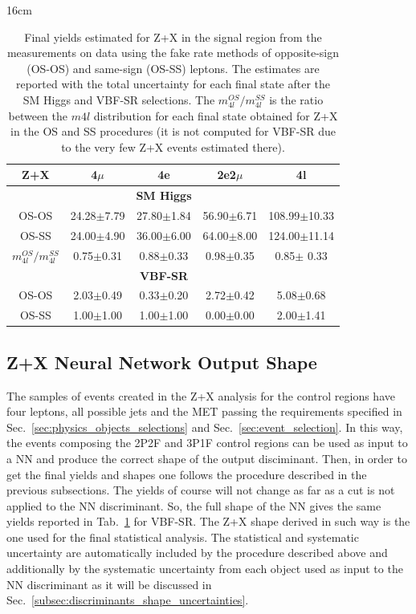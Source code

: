 \begin{table}[hbtp]{16cm}
	\centering
	\caption{Final yields estimated for Z+X in the signal region from the measurements on data using the fake rate methods of opposite-sign (OS-OS) and same-sign (OS-SS) leptons. The estimates are reported with the total uncertainty for each final state after the SM Higgs and VBF-SR selections. The $m_{4l}^{OS}/m_{4l}^{SS}$ is the ratio between the $m4l$ distribution for each final state obtained for Z+X in the OS and SS procedures (it is not computed for VBF-SR due to the very few Z+X events estimated there).}
	\begin{tabular}{c|c|c|c|c}
		\hline
		\rowcolor{light_gray}
		Z+X                       & 4$\mu$         & 4e                & 2e2$\mu$       & 4l\\
		\hline
		                          &                & \textbf{SM Higgs} &                &\\
		\hline
		OS-OS                     & 24.28$\pm$7.79 & 27.80$\pm$1.84    & 56.90$\pm$6.71 & 108.99$\pm$10.33\\
		OS-SS                     & 24.00$\pm$4.90 & 36.00$\pm$6.00    & 64.00$\pm$8.00 & 124.00$\pm$11.14\\
		$m_{4l}^{OS}/m_{4l}^{SS}$ &  0.75$\pm$0.31 &  0.88$\pm$0.33    &  0.98$\pm$0.35 &   0.85$\pm$ 0.33\\
		\hline
		                          &                & \textbf{VBF-SR}   &                &\\
		\hline
		OS-OS                     & 2.03$\pm$0.49  & 0.33$\pm$0.20     & 2.72$\pm$0.42  & 5.08$\pm$0.68\\
		OS-SS                     & 1.00$\pm$1.00  & 1.00$\pm$1.00     & 0.00$\pm$0.00  & 2.00$\pm$1.41\\
		\hline
	\end{tabular}
	\label{tab:final_zx_estimation}	
\end{table}


\subsection{Z+X Neural Network Output Shape}
The samples of events created in the Z+X analysis for the control regions have four leptons, all possible jets and the MET passing the requirements specified in Sec.~\ref{sec:physics_objects_selections} and Sec.~\ref{sec:event_selection}. In this way, the events composing the 2P2F and 3P1F control regions can be used as input to a NN and produce the correct shape of the output disciminant. Then, in order to get the final yields and shapes one follows the procedure described in the previous subsections. The yields of course will not change as far as a cut is not applied to the NN discriminant. So, the full shape of the NN gives the same yields reported in Tab.~\ref{tab:final_zx_estimation} for VBF-SR. The Z+X shape derived in such way is the one used for the final statistical analysis. The statistical and systematic uncertainty are automatically included by the procedure described above and additionally by the systematic uncertainty from each object used as input to the NN discriminant as it will be discussed in Sec.~\ref{subsec:discriminants_shape_uncertainties}.


